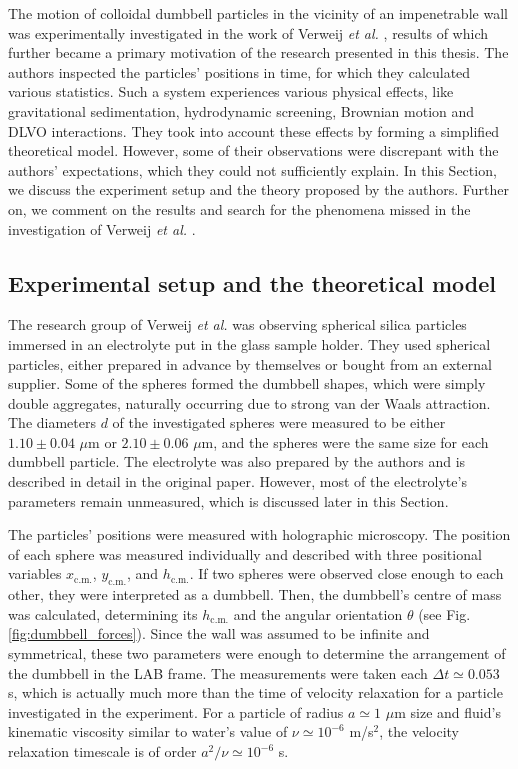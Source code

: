 \documentclass{master_thesis}
\begin{document}
The motion of colloidal dumbbell particles in the vicinity of an impenetrable wall was experimentally investigated in the work of Verweij \textit{et al.} \cite{verweij2021}, results of which further became a primary motivation of the research presented in this thesis. The authors inspected the particles' positions in time, for which they calculated various statistics. Such a system experiences various physical effects, like gravitational sedimentation, hydrodynamic screening, Brownian motion and DLVO interactions. They took into account these effects by forming a simplified theoretical model. However, some of their observations were discrepant with the authors' expectations, which they could not sufficiently explain. In this Section, we discuss the experiment setup and the theory proposed by the authors. Further on, we comment on the results and search for the phenomena missed in the investigation of Verweij \textit{et al.} \cite{verweij2021}.

\subsection{Experimental setup and the theoretical model}

The research group of Verweij \textit{et al.} \cite{verweij2021} was observing spherical silica particles immersed in an electrolyte put in the glass sample holder. They used spherical particles, either prepared in advance by themselves or bought from an external supplier. Some of the spheres formed the dumbbell shapes, which were simply double aggregates, naturally occurring due to strong van der Waals attraction. The diameters $d$ of the investigated spheres were measured to be either $1.10 \pm 0.04$ $\mu$m or $2.10 \pm 0.06$ $\mu$m, and the spheres were the same size for each dumbbell particle. The electrolyte was also prepared by the authors and is described in detail in the original paper. However, most of the electrolyte's parameters remain unmeasured, which is discussed later in this Section.

The particles’ positions were measured with holographic microscopy. The position of each sphere was measured individually and described with three positional variables $x_{\textrm{c.m.}}$, $y_{\textrm{c.m.}}$, and $h_{\textrm{c.m.}}$. If two spheres were observed close enough to each other, they were interpreted as a dumbbell. Then, the dumbbell's centre of mass was calculated, determining its $h_{\textrm{c.m.}}$ and the angular orientation $\theta$ (see Fig. \ref{fig:dumbbell_forces}). Since the wall was assumed to be infinite and symmetrical, these two parameters were enough to determine the arrangement of the dumbbell in the LAB frame. The measurements were taken each $\Delta t\simeq0.053$ s, which is actually much more than the time of velocity relaxation for a particle investigated in the experiment. For a particle of radius $a \simeq 1$ $\mu$m size and fluid's kinematic viscosity similar to water's value of $\nu \simeq 10^{-6}$ m/s$^2$, the velocity relaxation timescale is of order $a^2/\nu \simeq 10^{-6}$ s.
\end{document}
